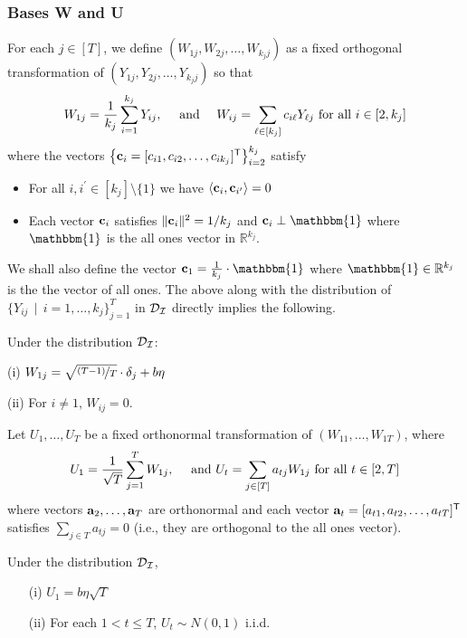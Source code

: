 \subsubsection{Bases {\bf W} and {\bf U}} \label{sec:R=1Basis}
For each $j \in [T]$, we define $(W_{1j}, W_{2j}, \dots, W_{k_jj})$ as a fixed orthogonal transformation of $(Y_{1j}, Y_{2j}, \dots, Y_{k_jj})$ so that
\begin{equation}
W_{1j} = \frac{1}{ k_j} \sum_{i=1}^{k_j} Y_{ij},  \ \ \ \ \tn{and} \ \ \ \ 
W_{ij} = \sum_{\ell \in [k_j]}c_{i\ell}Y_{\ell j}\ \tn{for all $i \in [2, k_j]$}
\end{equation} 
where the vectors $\left\{{\bf c}_i =[c_{i1}, c_{i2}, \ldots ,c_{ik_j}]^{\sf{T}}\right\}_{i=2}^{k_j}$ satisfy 
\begin{itemize}
	\item For all $i,i^\prime \in [k_j] \setminus \{1\}$ we have $\langle {\bf c}_i, {\bf c}_{i^\prime} \rangle = 0$
	\item Each vector ${\bf c}_i$ satisfies $\|{\bf c}_i\|^2 = 1/k_j$ and ${\bf c}_i \perp \mathbbm{1}$ where $\mathbbm{1}$ is the all ones vector in $\mathbb{R}^{k_j}$.
\end{itemize}
We shall also define the vector ${\bf c}_1 = \frac{1}{k_j}\cdot\mathbbm{1}$ where $\mathbbm{1} \in \R^{k_j}$ is the the vector of all ones.
The above along with the distribution of $\{Y_{ij}\,\mid\, i = 1,\dots,k_j\}_{j=1}^T$ in $\mathcal{D}_{\mathcal{I}}$ directly implies the following.
\begin{lemma}\label{lem:W-dist}
Under the distribution $\mathcal{D}_\mathcal{I}$:
\begin{enumerate*}
\item[(i)]
$W_{1j} = \sqrt{\nicefrac{(T-1)}{T}} \cdot \delta_j + b\eta$ 
\item[(ii)]  For $i \neq 1$, $W_{ij} = 0$.
\end{enumerate*}
\end{lemma}
Let $U_1, \dots, U_T$ be a fixed orthonormal transformation of $(W_{11}, \dots, W_{1T})$, where
\begin{equation}
U_1 = \frac{1}{\sqrt{T}} \sum_{j=1}^T W_{1j}, \ \ \ \ \tn{and}\ 
U_t = \sum_{j \in [T]}a_{tj}W_{1j} \ \tn{for all $t \in [2, T]$}
\end{equation}
where vectors ${\bf a}_2,\ldots,{\bf a}_T$ are orthonormal and each vector ${\bf a}_t = [a_{t1}, a_{t2}, \ldots ,a_{tT}]^{\sf{T}}$  satisfies   $\sum_{j \in T}{a}_{tj} =0$ (i.e., they are orthogonal to the all ones vector).
\begin{lemma}\label{lem:U-dist}
Under the distribution $\mathcal{D}_{\mathcal{I}}$,
\begin{itemize}
\item[(i)] $U_1 = {b\eta}{\sqrt{T}}$
\item[(ii)] For each $1 < t \leq T$, $U_t \sim N(0,1)$ i.i.d.  
\end{itemize}
\end{lemma}
